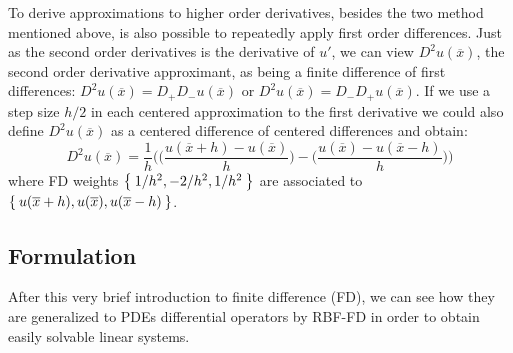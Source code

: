 To derive approximations to higher order derivatives, besides the two method mentioned above, is also possible to repeatedly apply first order differences. Just as the second order derivatives is the derivative of $u'$, we can view $D^2u(\overline{x})$, the second order derivative approximant, as being a finite difference of first differences: $D^2 u(\overline{x}) = D_+ D_- u(\overline{x})$ or $D^2 u(\overline{x}) = D_- D_+ u(\overline{x})$. If we use a step size $h/2$ in each centered approximation to the first derivative we could also define $D^2 u(\overline{x})$ as a centered difference of centered differences and obtain:
\begin{equation}
	D^2 u(\overline{x}) = \frac{1}{h} \Biggl( \biggl( \frac{u(\overline{x}+h) - u(\overline{x})}{h} \biggr) - \biggl( \frac{u(\overline{x}) - u(\overline{x}-h)}{h} \biggr) \Biggr)
\end{equation}
where FD weights $\Set{1/h^2, -2/h^2, 1/h^2}$ are associated to $\Set{u(\overline{x}+h), u(\overline{x}), u(\overline{x}-h)}$.


\subsection{Formulation}
\label{subsec:RBF-FD_formulation}

After this very brief introduction to finite difference (FD), we can see how they are generalized to PDEs differential operators by RBF-FD in order to obtain easily solvable linear systems.

